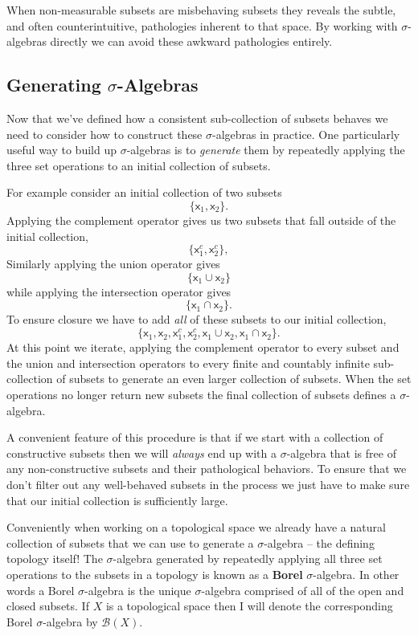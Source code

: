 \documentclass[
  letterpaper,
  DIV=11,
  numbers=noendperiod]{scrartcl}
\begin{document}
When non-measurable subsets are misbehaving subsets they reveals the
subtle, and often counterintuitive, pathologies inherent to that space.
By working with \(\sigma\)-algebras directly we can avoid these awkward
pathologies entirely.

\hypertarget{generating-sigma-algebras}{%
\subsection{\texorpdfstring{Generating
{\(\sigma\)}-Algebras}{Generating \textbackslash sigma-Algebras}}\label{generating-sigma-algebras}}

Now that we've defined how a consistent sub-collection of subsets
behaves we need to consider how to construct these \(\sigma\)-algebras
in practice. One particularly useful way to build up \(\sigma\)-algebras
is to \emph{generate} them by repeatedly applying the three set
operations to an initial collection of subsets.

For example consider an initial collection of two subsets \[
\{ \mathsf{x}_1, \mathsf{x}_2 \}.
\] Applying the complement operator gives us two subsets that fall
outside of the initial collection, \[
\{ \mathsf{x}_1^c, \mathsf{x}_2^c \},
\] Similarly applying the union operator gives \[
\{ \mathsf{x}_1 \cup \mathsf{x}_2 \}
\] while applying the intersection operator gives \[
\{ \mathsf{x}_1 \cap \mathsf{x}_2 \}.
\] To ensure closure we have to add \emph{all} of these subsets to our
initial collection, \[
\{ \mathsf{x}_1, \mathsf{x}_2, \mathsf{x}_1^c, \mathsf{x}_2^c,
   \mathsf{x}_1 \cup \mathsf{x}_2, \mathsf{x}_1 \cap \mathsf{x}_2 \}.
\] At this point we iterate, applying the complement operator to every
subset and the union and intersection operators to every finite and
countably infinite sub-collection of subsets to generate an even larger
collection of subsets. When the set operations no longer return new
subsets the final collection of subsets defines a \(\sigma\)-algebra.

A convenient feature of this procedure is that if we start with a
collection of constructive subsets then we will \emph{always} end up
with a \(\sigma\)-algebra that is free of any non-constructive subsets
and their pathological behaviors. To ensure that we don't filter out any
well-behaved subsets in the process we just have to make sure that our
initial collection is sufficiently large.

Conveniently when working on a topological space we already have a
natural collection of subsets that we can use to generate a
\(\sigma\)-algebra -- the defining topology itself! The
\(\sigma\)-algebra generated by repeatedly applying all three set
operations to the subsets in a topology is known as a \textbf{Borel}
\(\sigma\)-algebra. In other words a Borel \(\sigma\)-algebra is the
unique \(\sigma\)-algebra comprised of all of the open and closed
subsets. If \(X\) is a topological space then I will denote the
corresponding Borel \(\sigma\)-algebra by \(\mathcal{B}(X)\).
\end{document}
